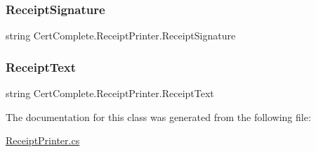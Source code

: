 \subsubsection{\texorpdfstring{Receipt\+Signature}{ReceiptSignature}}
{\footnotesize\ttfamily string Cert\+Complete.\+Receipt\+Printer.\+Receipt\+Signature\hspace{0.3cm}{\ttfamily [private]}}

\mbox{\label{class_cert_complete_1_1_receipt_printer_a36c59964a9dba0f7ffadbe7823ba6245}} 
\subsubsection{\texorpdfstring{Receipt\+Text}{ReceiptText}}
{\footnotesize\ttfamily string Cert\+Complete.\+Receipt\+Printer.\+Receipt\+Text\hspace{0.3cm}{\ttfamily [private]}}



The documentation for this class was generated from the following file\+:\begin{DoxyCompactItemize}
\item 
\mbox{\hyperlink{_receipt_printer_8cs}{Receipt\+Printer.\+cs}}\end{DoxyCompactItemize}
